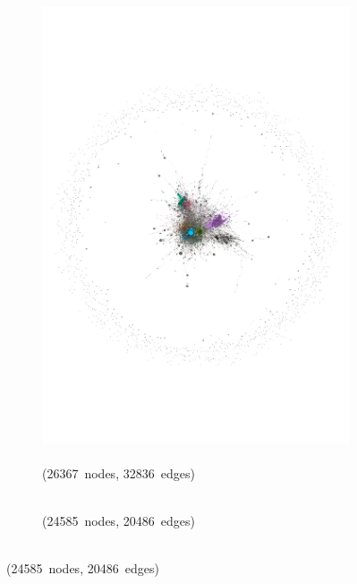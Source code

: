 \documentclass[
  a4paper,
  abstract=on,
  captions=tableabove
  ]{scrartcl}
\begin{document}
\begin{figure}
        \begin{subfigure}{.45\linewidth}
          \caption{\\ (\num{26367}~nodes, \num{32836}~edges)}
          \label{subfig:net_last_cases_alt-left}
          \includegraphics[width=\linewidth, height=\textheight, keepaspectratio]{img/net_alt-left_four.pdf}
        \end{subfigure}
        \begin{subfigure}{.45\linewidth}
          \caption{\\ (\num{24585}~nodes, \num{20486}~edges)}
          \label{subfig:net_last_cases_solopreneur}

\end{subfigure}
\end{figure}
\end{document}
